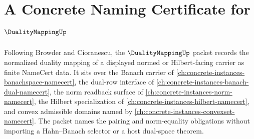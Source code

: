 \chapter{A Concrete Naming Certificate for $\DualityMappingUp$}
\label{ch:concrete-instances-duality-mapping-namecert}

Following Browder and Cioranescu, the $\DualityMappingUp$ packet records the normalized duality mapping of a displayed normed or Hilbert-facing carrier as finite NameCert data. It sits over the Banach carrier of \autoref{ch:concrete-instances-banachspace-namecert}, the dual-row interface of \autoref{ch:concrete-instances-banach-dual-namecert}, the norm readback surface of \autoref{ch:concrete-instances-norm-namecert}, the Hilbert specialization of \autoref{ch:concrete-instances-hilbert-namecert}, and convex admissible domains named by \autoref{ch:concrete-instances-convexset-namecert}. The packet names the pairing and norm-equality obligations without importing a Hahn--Banach selector or a host dual-space theorem.

